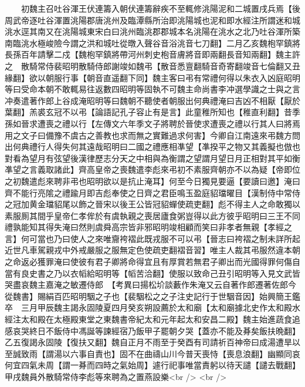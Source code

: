 　　初魏主召吐谷渾王伏連籌入朝伏連籌辭疾不至輒修洮陽泥和二城置戌兵焉【後周武帝逐吐谷渾置洮陽郡唐洮州及臨潭縣所治即洮陽城也泥和即水經注所謂迷和城洮水逕其南又在洮陽城東宋白曰洮州臨洮郡郡城本名洮陽在洮水之北乃吐谷渾所築南臨洮水極峻險今謂之洪和城吐從暾入聲谷音浴洮音七刀翻】二月乙亥魏枹罕鎮將長孫百年請擊二戍【魏枹罕鎮將帶河州刺史枹音膚將音即兩翻長音知兩翻】魏主許之　散騎常侍裴昭明散騎侍郎謝竣如魏弔【散音悉亶翻騎音奇寄翻竣音七倫翻又丑緣翻】欲以朝服行事【朝音直遥翻下同】魏主客曰弔有常禮何得以朱衣入凶庭昭明等曰受命本朝不敢輒易往返數四昭明等固執不可魏主命尚書李冲選學識之士與之言冲奏遣著作郎上谷成淹昭明等曰魏朝不聽使者朝服出何典禮淹曰吉凶不相厭【厭於葉翻】羔裘玄冠不以弔【論語記孔子容止有是言】此童稚所知也【稚直利翻】昔季孫如晉求遭喪之禮以行【左傳文六年季文子將聘於晉使求遭喪之禮以行其人曰將焉用之文子曰備豫不虞古之善教也求而無之實難過求何害】今卿自江南遠來弔魏方問出何典禮行人得失何其遠哉昭明曰二國之禮應相凖望【凖揆平之物又其義擬也倣也對看為望月有弦望後漢律歷志分天之中相與為衡謂之望謂月望日月正相對其平如衡凖望之言義取諸此】齊高皇帝之喪魏遣李彪來弔初不素服齊朝亦不以為疑【帝即位之初魏遣彪來聘非弔也昭明欲以是抗止淹耳】何至今日獨見要逼【要讀曰邀】淹曰齊不能行亮隂之禮踰月即吉彪奉使之日齊之君臣鳴玉盈庭貂璫曜目【漢制侍中常侍之冠加黄金璫貂尾以飾之晉宋以後王公皆冠貂蟬使疏吏翻】彪不得主人之命敢獨以素服厠其間乎皇帝仁孝侔於有虞執親之喪居廬食粥豈得以此方彼乎昭明曰三王不同禮孰能知其得失淹曰然則虞舜高宗皆非邪昭明竣相顧而笑曰非孝者無親【孝經之言】何可當也乃曰使人之來唯齎袴褶此既戎服不可以弔【晉志曰袴褶之制未詳所起近世凡車駕親戎中外戒嚴服之服無定色使疏吏翻褶音習】唯主人裁其弔服然違本朝之命返必獲罪淹曰使彼有君子卿將命得宜且有厚賞若無君子卿出而光國得罪何傷自當有良史書之乃以衣幍給昭明等【幍苦洽翻】使服以致命己丑引昭明等入見文武皆哭盡哀魏主嘉淹之敏遷侍郎　【考異曰揚松圿談藪作朱淹又云自著作郎遷著佐郎今從魏書】賜絹百匹昭明駰之子也【裴駰松之之子注史記行于世駰音因】始興簡王鑑卒　三月甲辰魏主謁永固陵夏四月癸亥朔設薦於太和廟【太和廟據北史作太和殿水經注太和殿在太極殿東堂之東魏書帝紀太和元年起太和安昌二殿】魏主始進蔬食追感哀哭終日不飯侍中馮誕等諫經宿乃飯甲子罷朝夕哭【蓋亦不能及朞矣飯扶晩翻】乙五復謁永固陵【復扶又翻】魏自正月不雨至于癸酉有司請祈百神帝曰成湯遭旱以至誠致雨【謂湯以六事自責也】固不在曲禱山川今普天喪恃【喪息浪翻】幽顯同哀何宜四氣未周【謂一朞而四時之氣始周】遽行祀事唯當責躬以待天譴【譴去戰翻】甲戌魏員外散騎常侍李彪等來聘為之置燕設樂<br />
<br />

